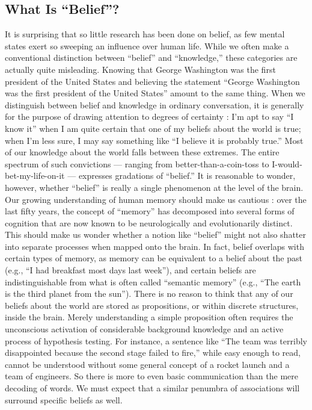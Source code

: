 \documentclass[a4paper,14pt]{extbook}
\begin{document}
\subsection{What Is ``Belief''?}

It is surprising that so little research has been done on belief, as few mental states exert so sweeping an influence over human life.
While we often make a conventional distinction between ``belief'' and ``knowledge,'' these categories are actually quite misleading.
Knowing that George Washington was the first president of the United States and believing the statement ``George Washington was the first president of the United States'' amount to the same thing.
When we distinguish between belief and knowledge in ordinary conversation, it is generally for the purpose of drawing attention to degrees of certainty :
I’m apt to say ``I know it'' when I am quite certain that one of my beliefs about the world is true;
when I’m less sure, I may say something like ``I believe it is probably true.''
Most of our knowledge about the world falls between these extremes.
The entire spectrum of such convictions --- ranging from better-than-a-coin-toss to I-would-bet-my-life-on-it --- expresses gradations of ``belief.''
It is reasonable to wonder, however, whether ``belief'' is really a single phenomenon at the level of the brain.
Our growing understanding of human memory should make us cautious :
over the last fifty years, the concept of ``memory'' has decomposed into several forms of cognition that are now known to be neurologically and evolutionarily distinct.
This should make us wonder whether a notion like ``belief'' might not also shatter into separate processes when mapped onto the brain.
In fact, belief overlaps with certain types of memory, as memory can be equivalent to a belief about the past (e.g., ``I had breakfast most days last week''), and certain beliefs are indistinguishable from what is often called ``semantic memory'' (e.g., ``The earth is the third planet from the sun'').
There is no reason to think that any of our beliefs about the world are stored as propositions, or within discrete structures, inside the brain.
Merely understanding a simple proposition often requires the unconscious activation of considerable background knowledge and an active process of hypothesis testing.
For instance, a sentence like ``The team was terribly disappointed because the second stage failed to fire,'' while easy enough to read, cannot be understood without some general concept of a rocket launch and a team of engineers.
So there is more to even basic communication than the mere decoding of words.
We must expect that a similar penumbra of associations will surround specific beliefs as well.
\end{document}
